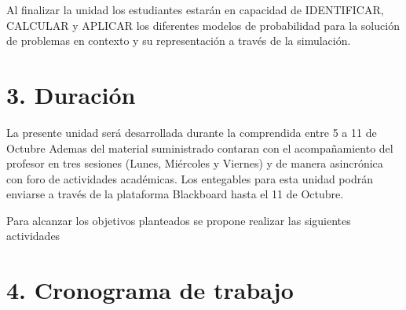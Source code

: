 \documentclass[base=hide,11pt]{elegantbook}
\begin{document}
Al finalizar la unidad los estudiantes estarán  en  capacidad de  IDENTIFICAR, CALCULAR y APLICAR los diferentes modelos de probabilidad para la solución de problemas en contexto  y su representación a través de la simulación.



\section*{3. Duración}
La presente  unidad será desarrollada durante la comprendida entre 5 a 11 de Octubre    
Ademas del material suministrado  contaran con el acompañamiento del profesor en tres sesiones (Lunes, Miércoles y Viernes) y de manera asincrónica con  foro de actividades académicas. Los entegables para esta unidad podrán enviarse a través de la plataforma Blackboard hasta el  11 de Octubre.

Para alcanzar los objetivos planteados se propone realizar las siguientes actividades
% 	
\section*{4. Cronograma de trabajo}
\end{document}
